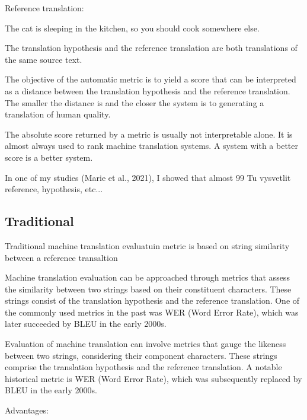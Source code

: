     Reference translation:

The cat is sleeping in the kitchen, so you should cook somewhere else.

The translation hypothesis and the reference translation are both translations of the same source text.

The objective of the automatic metric is to yield a score that can be interpreted as a distance between the translation hypothesis and the reference translation. The smaller the distance is and the closer the system is to generating a translation of human quality.

The absolute score returned by a metric is usually not interpretable alone. It is almost always used to rank machine translation systems. A system with a better score is a better system.

In one of my studies (Marie et al., 2021), I showed that almost 99%
Tu vysvetlit reference, hypothesis, etc...

\subsection{Traditional}
Traditional machine translation evaluatuin metric is based on string similarity between a reference transaltion 

Machine translation evaluation can be approached through metrics that assess the similarity between two strings based on their constituent characters. These strings consist of the translation hypothesis and the reference translation. One of the commonly used metrics in the past was WER (Word Error Rate), which was later succeeded by BLEU in the early 2000s.



Evaluation of machine translation can involve metrics that gauge the likeness between two strings, considering their component characters. These strings comprise the translation hypothesis and the reference translation. A notable historical metric is WER (Word Error Rate), which was subsequently replaced by BLEU in the early 2000s.


Advantages:

